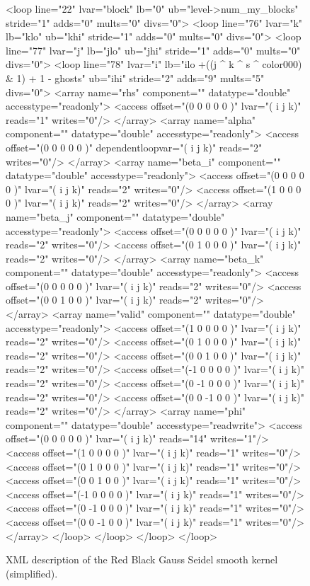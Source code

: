 \documentclass{article}
\begin{document}
\begin{figure}[htp]
\begin{boxedverbatim}
<loop line="22" lvar="block" lb="0" ub="level->num_my_blocks" stride="1" 
adds="0" mults="0" divs="0">
<loop line="76" lvar="k" lb="klo" ub="khi" stride="1" adds="0" mults="0" divs="0">
<loop line="77" lvar="j" lb="jlo" ub="jhi" stride="1" adds="0" mults="0" divs="0">
<loop line="78" lvar="i" lb="ilo +((j ^ k ^ s ^ color000) & 1) + 1 - ghosts" 
ub="ihi" stride="2" adds="9" mults="5" divs="0">
<array name="rhs" component="" datatype="double" accesstype="readonly">
<access offset="(0 0 0 0 0 )" lvar="(  i j k)" reads="1" writes="0"/>
</array>
<array name="alpha" component="" datatype="double" accesstype="readonly">
<access offset="(0 0 0 0 0 )" dependentloopvar="(  i j k)" reads="2" writes="0"/>
</array>
<array name="beta_i" component="" datatype="double" accesstype="readonly">
<access offset="(0 0 0 0 0 )" lvar="(  i j k)" reads="2" writes="0"/>
<access offset="(1 0 0 0 0 )" lvar="(  i j k)" reads="2" writes="0"/>
</array>
<array name="beta_j" component="" datatype="double" accesstype="readonly">
<access offset="(0 0 0 0 0 )" lvar="(  i j k)" reads="2" writes="0"/>
<access offset="(0 1 0 0 0 )" lvar="(  i j k)" reads="2" writes="0"/>
</array>
<array name="beta_k" component="" datatype="double" accesstype="readonly">
<access offset="(0 0 0 0 0 )" lvar="(  i j k)" reads="2" writes="0"/>
<access offset="(0 0 1 0 0 )" lvar="(  i j k)" reads="2" writes="0"/>
</array>
<array name="valid" component="" datatype="double" accesstype="readonly">
<access offset="(1 0 0 0 0 )" lvar="(  i j k)" reads="2" writes="0"/>
<access offset="(0 1 0 0 0 )" lvar="(  i j k)" reads="2" writes="0"/>
<access offset="(0 0 1 0 0 )" lvar="(  i j k)" reads="2" writes="0"/>
<access offset="(-1 0 0 0 0 )" lvar="(  i j k)" reads="2" writes="0"/>
<access offset="(0 -1 0 0 0 )" lvar="(  i j k)" reads="2" writes="0"/>
<access offset="(0 0 -1 0 0 )" lvar="(  i j k)" reads="2" writes="0"/>
</array>
<array name="phi" component="" datatype="double" accesstype="readwrite">
<access offset="(0 0 0 0 0 )" lvar="(  i j k)" reads="14" writes="1"/>
<access offset="(1 0 0 0 0 )" lvar="(  i j k)" reads="1" writes="0"/>
<access offset="(0 1 0 0 0 )" lvar="(  i j k)" reads="1" writes="0"/>
<access offset="(0 0 1 0 0 )" lvar="(  i j k)" reads="1" writes="0"/>
<access offset="(-1 0 0 0 0 )" lvar="(  i j k)" reads="1" writes="0"/>
<access offset="(0 -1 0 0 0 )" lvar="(  i j k)" reads="1" writes="0"/>
<access offset="(0 0 -1 0 0 )" lvar="(  i j k)" reads="1" writes="0"/>
</array>
</loop>
</loop>
</loop>
</loop>
\end{boxedverbatim}
\caption{XML description of the Red Black Gauss Seidel smooth kernel (simplified).}
\label{redblackXML}
\end{figure}
\end{document}
